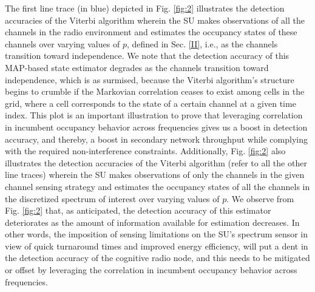 \documentclass[10pt,twocolumn]{IEEEtran}
\begin{document}
The first line trace (in blue) depicted in Fig. \ref{fig:2} illustrates the detection accuracies of the Viterbi algorithm wherein the SU makes observations of all the channels in the radio environment and estimates the occupancy states of these channels over varying values of $p$, defined in Sec. \ref{II}, i.e., as the channels transition toward independence. We note that the detection accuracy of this MAP-based state estimator degrades as the channels transition toward independence, which is as surmised, because the Viterbi algorithm's structure begins to crumble if the Markovian correlation ceases to exist among cells in the grid, where a cell corresponds to the state of a certain channel at a given time index. This plot is an important illustration to prove that leveraging correlation in incumbent occupancy behavior across frequencies gives us a boost in detection accuracy, and thereby, a boost in secondary network throughput while complying with the required non-interference constraints. Additionally, Fig. \ref{fig:2} also illustrates the detection accuracies of the Viterbi algorithm (refer to all the other line traces) wherein the SU makes observations of only the channels in the given channel sensing strategy and estimates the occupancy states of all the channels in the discretized spectrum of interest over varying values of $p$. We observe from Fig. \ref{fig:2} that, as anticipated, the detection accuracy of this estimator deteriorates as the amount of information available for estimation decreases. In other words, the imposition of sensing limitations on the SU's spectrum sensor in view of quick turnaround times and improved energy efficiency, will put a dent in the detection accuracy of the cognitive radio node, and this needs to be mitigated or offset by leveraging the correlation in incumbent occupancy behavior across frequencies.
\end{document}
